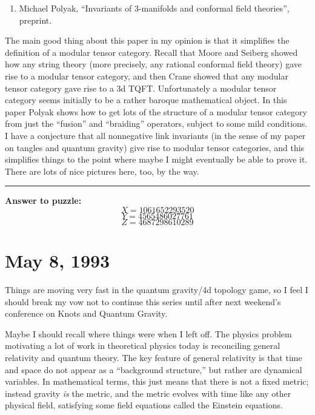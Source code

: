 \documentclass[12pt]{article}
\def\tightlist{}
\begin{document}
\begin{enumerate}
\def\labelenumi{\arabic{enumi})}
\setcounter{enumi}{5}
\tightlist
\item
  Michael  Polyak, ``Invariants of 3-manifolds and conformal field theories'', preprint.
\end{enumerate}
\noindent
The main good thing about this paper in my opinion is that it simplifies
the definition of a modular tensor category. Recall that Moore and
Seiberg showed how any string theory (more precisely, any rational
conformal field theory) gave rise to a modular tensor category, and then
Crane showed that any modular tensor category gave rise to a 3d TQFT.
Unfortunately a modular tensor category seems initially to be a rather
baroque mathematical object. In this paper Polyak shows how to get lots
of the structure of a modular tensor category from just the ``fusion''
and ``braiding'' operators, subject to some mild conditions. I have a
conjecture that all nonnegative link invariants (in the sense of my
paper on tangles and quantum gravity) give rise to modular tensor
categories, and this simplifies things to the point where maybe I might
eventually be able to prove it. There are lots of nice pictures here,
too, by the way.

\begin{center}\rule{0.5\linewidth}{0.5pt}\end{center}

\textbf{Answer to puzzle:} \[X = 1061652293520\] \[Y = 4565486027761\]
\[Z = 4687298610289\]



\hypertarget{week14}{%
\section{May 8, 1993}\label{week14}}

Things are moving very fast in the quantum gravity/4d topology game, so
I feel I should break my vow not to continue this series until after
next weekend's conference on Knots and Quantum Gravity.

Maybe I should recall where things were when I left off. The physics
problem motivating a lot of work in theoretical physics today is
reconciling general relativity and quantum theory. The key feature of
general relativity is that time and space do not appear as a
``background structure,'' but rather are dynamical variables. In
mathematical terms, this just means that there is not a fixed metric;
instead gravity \emph{is} the metric, and the metric evolves with time
like any other physical field, satisfying some field equations called
the Einstein equations.
\end{document}

